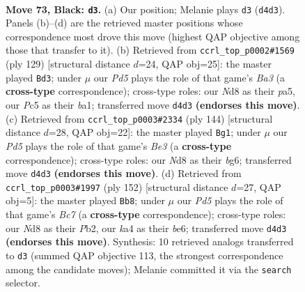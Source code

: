 \documentclass[11pt]{article}
\begin{document}
\clearpage

\begin{figure}[p]\centering
\begin{subfigure}{0.46\textwidth}\centering
\resizebox{\linewidth}{!}{%
\newchessgame
\chessboard[
  setfen={3n4/2k3p1/1p4p1/p1p5/K1Pp4/1P6/8/8 b - - 1 73},
  showmover=false,
  pgfstyle=straightmove, color=movearrow, markmove={d4-d3}
]}
\caption{}
\end{subfigure}\hfill
\begin{subfigure}{0.46\textwidth}\centering
\resizebox{\linewidth}{!}{%
\newchessgame
\chessboard[
  setfen={8/8/b3kp2/P4p1p/4p2P/4K3/5P2/B7 b - - 19 65},
  showmover=false,
  pgfstyle=straightmove, color=movearrow, markmove={a6-d3}
]}
\caption{}
\end{subfigure}
\\[4pt]
\begin{subfigure}{0.46\textwidth}\centering
\resizebox{\linewidth}{!}{%
\newchessgame
\chessboard[
  setfen={5K2/1p6/p3k1b1/P2pP3/1P1P4/4B3/8/8 w - - 27 73},
  showmover=false,
  pgfstyle=straightmove, color=movearrow, markmove={e3-g1}
]}
\caption{}
\end{subfigure}\hfill
\begin{subfigure}{0.46\textwidth}\centering
\resizebox{\linewidth}{!}{%
\newchessgame
\chessboard[
  setfen={8/2B5/4b3/1p4k1/1P3p1p/5P1P/1P4P1/6K1 w - - 24 77},
  showmover=false,
  pgfstyle=straightmove, color=movearrow, markmove={c7-b8}
]}
\caption{}
\end{subfigure}
\caption{\textbf{Move 73, Black: \texttt{d3}.} (a) Our position; Melanie plays \texttt{d3} (\texttt{d4d3}). Panels (b)--(d) are the retrieved master positions whose correspondence most drove this move (highest QAP objective among those that transfer to it). (b) Retrieved from \texttt{ccrl\_top\_p0002\#1569} (ply 129) [structural distance $d$=24, QAP obj=25]: the master played \texttt{Bd3}; under $\mu$ our \emph{Pd5} plays the role of that game's \emph{Ba3} (a \textbf{cross-type} correspondence); cross-type roles: our \emph{N}d8 as their \emph{p}a5, our \emph{P}c5 as their \emph{b}a1; transferred move \texttt{d4d3} \textbf{(endorses this move)}. (c) Retrieved from \texttt{ccrl\_top\_p0003\#2334} (ply 144) [structural distance $d$=28, QAP obj=22]: the master played \texttt{Bg1}; under $\mu$ our \emph{Pd5} plays the role of that game's \emph{Be3} (a \textbf{cross-type} correspondence); cross-type roles: our \emph{N}d8 as their \emph{b}g6; transferred move \texttt{d4d3} \textbf{(endorses this move)}. (d) Retrieved from \texttt{ccrl\_top\_p0003\#1997} (ply 152) [structural distance $d$=27, QAP obj=5]: the master played \texttt{Bb8}; under $\mu$ our \emph{Pd5} plays the role of that game's \emph{Bc7} (a \textbf{cross-type} correspondence); cross-type roles: our \emph{N}d8 as their \emph{P}b2, our \emph{k}a4 as their \emph{b}e6; transferred move \texttt{d4d3} \textbf{(endorses this move)}. Synthesis: 10 retrieved analogs transferred to \texttt{d3} (summed QAP objective 113, the strongest correspondence among the candidate moves); Melanie committed it via the \texttt{search} selector.}
\label{fig:thought-m145}
\end{figure}
\end{document}
